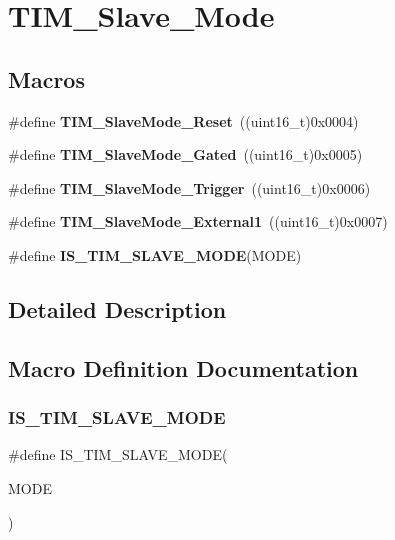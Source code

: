 \section{T\+I\+M\+\_\+\+Slave\+\_\+\+Mode}
\label{group__TIM__Slave__Mode}
\subsection*{Macros}
\begin{DoxyCompactItemize}
\item 
\#define \textbf{ T\+I\+M\+\_\+\+Slave\+Mode\+\_\+\+Reset}~((uint16\+\_\+t)0x0004)
\item 
\#define \textbf{ T\+I\+M\+\_\+\+Slave\+Mode\+\_\+\+Gated}~((uint16\+\_\+t)0x0005)
\item 
\#define \textbf{ T\+I\+M\+\_\+\+Slave\+Mode\+\_\+\+Trigger}~((uint16\+\_\+t)0x0006)
\item 
\#define \textbf{ T\+I\+M\+\_\+\+Slave\+Mode\+\_\+\+External1}~((uint16\+\_\+t)0x0007)
\item 
\#define \textbf{ I\+S\+\_\+\+T\+I\+M\+\_\+\+S\+L\+A\+V\+E\+\_\+\+M\+O\+DE}(M\+O\+DE)
\end{DoxyCompactItemize}


\subsection{Detailed Description}


\subsection{Macro Definition Documentation}
\mbox{\label{group__TIM__Slave__Mode_ga7f0e666bc968c56df7f1f6c2465c89fb}} 
\subsubsection{I\+S\+\_\+\+T\+I\+M\+\_\+\+S\+L\+A\+V\+E\+\_\+\+M\+O\+DE}
{\footnotesize\ttfamily \#define I\+S\+\_\+\+T\+I\+M\+\_\+\+S\+L\+A\+V\+E\+\_\+\+M\+O\+DE(\begin{DoxyParamCaption}\item[{}]{M\+O\+DE }\end{DoxyParamCaption})}

